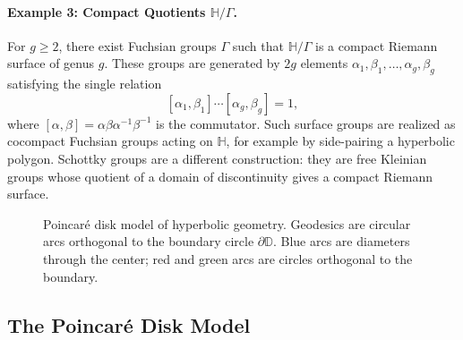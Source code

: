 \paragraph{Example 3: Compact Quotients $\mathbb{H}/\Gamma$.}
For $g \geq 2$, there exist Fuchsian groups $\Gamma$ such that $\mathbb{H}/\Gamma$ is a compact Riemann surface of genus $g$. These groups are generated by $2g$ elements $\alpha_1, \beta_1, \ldots, \alpha_g, \beta_g$ satisfying the single relation
\[
    [\alpha_1, \beta_1] \cdots [\alpha_g, \beta_g] = 1,
\]
where $[\alpha, \beta] = \alpha \beta \alpha^{-1} \beta^{-1}$ is the commutator. Such surface groups are realized as cocompact Fuchsian groups acting on $\mathbb{H}$, for example by side-pairing a hyperbolic polygon. Schottky groups are a different construction: they are free Kleinian groups whose quotient of a domain of discontinuity gives a compact Riemann surface.

\begin{figure}[htbp]
\centering
{}
\caption{Poincar\'e disk model of hyperbolic geometry. Geodesics are circular arcs orthogonal to the boundary circle $\partial \mathbb{D}$. Blue arcs are diameters through the center; red and green arcs are circles orthogonal to the boundary.}
\label{fig:poincare-disk}
\end{figure}

\subsection{The Poincar\'e Disk Model}

